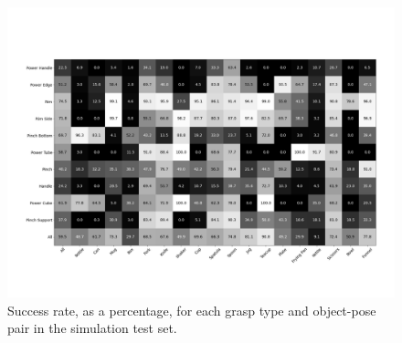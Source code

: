 \begin{figure}[h]
\centering
\includegraphics[width=\columnwidth]{images/mean_success_rate_per_grasp_type_and_object_class}
\caption{\label{fig:gop} Success rate, as a percentage, for each grasp type and object-pose pair in the simulation test set.}
\end{figure}



